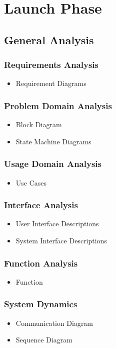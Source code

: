\section{Launch Phase}
\subsection{General Analysis}
	\subsubsection{Requirements	 Analysis}
		\begin{itemize}
			\item Requirement Diagrams
		\end{itemize}
	\subsubsection{Problem Domain Analysis}
		\begin{itemize}
			\item Block Diagram
			\item State Machine Diagrams
		\end{itemize}
	\subsubsection{Usage Domain Analysis}
		\begin{itemize}
			\item Use Cases
		\end{itemize}
	\subsubsection{Interface Analysis}
		\begin{itemize}
			\item User Interface Descriptions
			\item System Interface Descriptions
		\end{itemize}
	\subsubsection{Function Analysis}
		\begin{itemize}
			\item Function
		\end{itemize}
	\subsubsection{System Dynamics}
		\begin{itemize}
			\item Communication Diagram
			\item Sequence Diagram
		\end{itemize}
